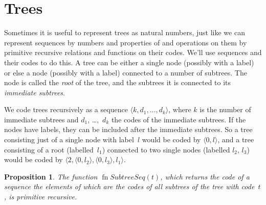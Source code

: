 \documentclass[10pt,a4paper]{article}
\theoremstyle{plain}
\newtheorem{prop}[thm]{Proposition}
\theoremstyle{definition}
\theoremstyle{remark}
\newcommand*{\olfileid}[3]{}
\newcommand*{\olsection}[1]{\section*{#1}}
\newcommand*{\ollabel}[1]{\label{#1}}
\providecommand{\tuple}[1]{\langle #1 \rangle}
\providecommand{\fn}{\operatorname{fn}}
\begin{document}
\olfileid{cmp}{rec}{tre}
\olsection{Trees}

Sometimes it is useful to represent trees as natural numbers, just
like we can represent sequences by numbers and properties of and
operations on them by primitive recursive relations and functions on
their codes.  We'll use sequences and their codes to do this. A tree
can be either a single node (possibly with a label) or else a node
(possibly with a label) connected to a number of subtrees. The node is
called the \emph{root} of the tree, and the subtrees it is connected
to its \emph{immediate subtrees}.

We code trees recursively as a sequence $\tuple{k, d_1, \dots, d_k}$,
where $k$ is the number of immediate subtrees and $d_1$, \dots,~$d_k$
the codes of the immediate subtrees. If the nodes have labels, they
can be included after the immediate subtrees. So a tree consisting
just of a single node with label~$l$ would be coded by $\tuple{0,l}$,
and a tree consisting of a root (labelled~$l_1$) connected to two
single nodes (labelled $l_2$, $l_3$) would be coded by $\tuple{2,
  \tuple{0, l_2}, \tuple{0, l_3}, l_1}$.

\begin{prop}
  \ollabel{prop:subtreeseq}
  The function $\fn{SubtreeSeq}(t)$, which returns the code of a
  sequence the elements of which are the codes of all subtrees of the
  tree with code~$t$, is primitive recursive.
\end{prop}
\end{document}
